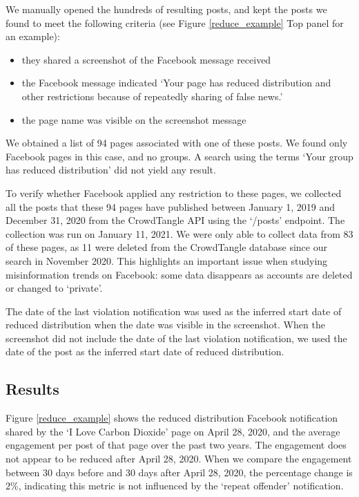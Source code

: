 \documentclass[11pt,a4paper]{article}
\begin{document}
We manually opened the hundreds of resulting posts, and kept the posts we found to meet the following criteria (see Figure \ref{reduce_example} Top panel for an example):
\begin{itemize}
\item they shared a screenshot of the Facebook message received
\item the Facebook message indicated `Your page has reduced distribution and other restrictions because of repeatedly sharing of false news.'
\item the page name was visible on the screenshot message
\end{itemize}

We obtained a list of 94 pages associated with one of these posts. 
We found only Facebook pages in this case, and no groups. 
A search using the terms `Your group has reduced distribution' did not yield any result.

To verify whether Facebook applied any restriction to these pages, we collected all the posts that these 94 pages have published between January 1, 2019 and December 31, 2020 from the CrowdTangle API using the `/posts' endpoint. 
The collection was run on January 11, 2021.
We were only able to collect data from 83 of these pages, as 11 were deleted from the CrowdTangle database since our search in November 2020. 
This highlights an important issue when studying misinformation trends on Facebook: some data disappears as accounts are deleted or changed to ‘private’.

The date of the last violation notification was used as the inferred start date of reduced distribution when the date was visible in the screenshot. 
When the screenshot did not include the date of the last violation notification, we used the date of the post as the inferred start date of reduced distribution. 

\subsection{Results}

Figure \ref{reduce_example} shows the reduced distribution Facebook notification shared by the ‘I Love Carbon Dioxide’ page on April 28, 2020, and the average engagement per post of that page over the past two years. 
The engagement does not appear to be reduced after April 28, 2020. 
When we compare the engagement between 30 days before and 30 days after April 28, 2020, the percentage change is $2\%$, indicating this metric is not influenced by the `repeat offender' notification.
\end{document}
